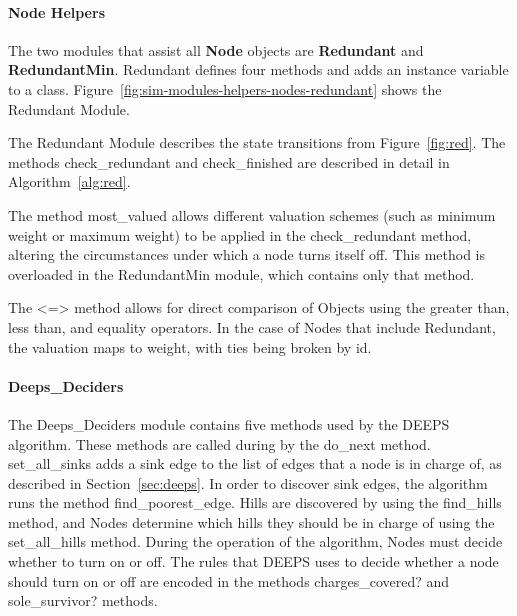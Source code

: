 \paragraph{Node Helpers}

The two modules that assist all {\bfseries Node} objects are {\bfseries Redundant} and {\bfseries RedundantMin}. Redundant defines four methods and adds an instance variable to a class. Figure~\ref{fig:sim-modules-helpers-nodes-redundant} shows the Redundant Module.



The Redundant Module describes the state transitions from Figure~\ref{fig:red}. The methods {\ttfamily check\_redundant} and {\ttfamily check\_finished} are described in detail in Algorithm~\ref{alg:red}.

The method {\ttfamily most\_valued} allows different valuation schemes (such as minimum weight or maximum weight) to be applied in the {\ttfamily check\_redundant} method, altering the circumstances under which a node turns itself off. This method is overloaded in the RedundantMin module, which contains only that method.

The {\ttfamily <=>} method allows for direct comparison of Objects using the greater than, less than, and equality operators. In the case of Nodes that include Redundant, the valuation maps to {\ttfamily weight}, with ties being broken by {\ttfamily id}. 

\paragraph{Deeps\_Deciders}

The Deeps\_Deciders module contains five methods used by the DEEPS algorithm. These methods are called during by the {\ttfamily do\_next} method. {\ttfamily set\_all\_sinks} adds a sink edge to the list of edges that a node is in charge of, as described in Section~\ref{sec:deeps}. In order to discover sink edges, the algorithm runs the method {\ttfamily find\_poorest\_edge}. Hills are discovered by using the {\ttfamily find\_hills} method, and Nodes determine which hills they should be in charge of using the {\ttfamily set\_all\_hills} method. During the operation of the algorithm, Nodes must decide whether to turn on or off. The rules that DEEPS uses to decide whether a node should turn on or off are encoded in the methods {\ttfamily charges\_covered?} and {\ttfamily sole\_survivor?} methods.

